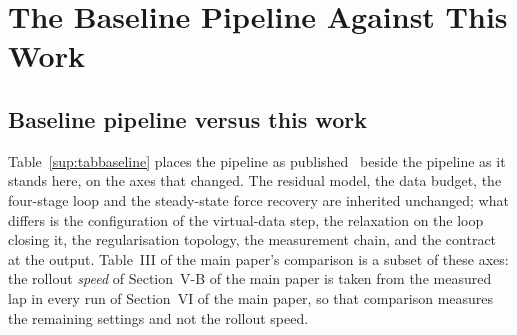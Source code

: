 \section{The Baseline Pipeline Against This Work}
\label{sup:baseline}

\subsection{Baseline pipeline versus this work}
\label{sup:baselinecmp}

Table~\ref{sup:tabbaseline} places the pipeline as published~\cite{ontrack2025}
beside the pipeline as it stands here, on the axes that changed. The residual
model, the data budget, the four-stage loop and the steady-state force recovery
are inherited unchanged; what differs is the configuration of the virtual-data
step, the relaxation on the loop closing it, the regularisation topology, the
measurement chain, and the contract at
the output. Table~III of the main paper's comparison is a subset of these axes:
the rollout \emph{speed} of Section~V-B of the main paper is taken from the
measured lap in every run of Section~VI of the main paper, so that comparison
measures the remaining settings and not the rollout speed.

